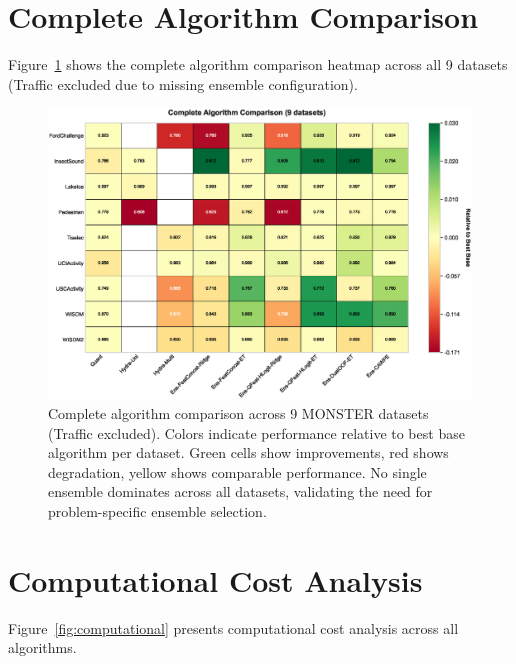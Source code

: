 \documentclass[pdflatex,sn-basic]{sn-jnl}           %
\theoremstyle{thmstyleone}%
\theoremstyle{thmstyletwo}%
\theoremstyle{thmstylethree}%
\begin{document}
\begin{appendices}
\clearpage

\section{Complete Algorithm Comparison}\label{appD}

Figure~\ref{fig:full_heatmap} shows the complete algorithm comparison heatmap across all 9 datasets (Traffic excluded due to missing ensemble configuration).

\begin{figure}[!htb]
\centering
\includegraphics[width=\textwidth]{figureA1_full_heatmap}
\caption{Complete algorithm comparison across 9 MONSTER datasets (Traffic excluded). Colors indicate performance relative to best base algorithm per dataset. Green cells show improvements, red shows degradation, yellow shows comparable performance. No single ensemble dominates across all datasets, validating the need for problem-specific ensemble selection.}\label{fig:full_heatmap}
\end{figure}

\clearpage

\section{Computational Cost Analysis}\label{appE}

Figure~\ref{fig:computational} presents computational cost analysis across all algorithms.


\end{appendices}
\end{document}
